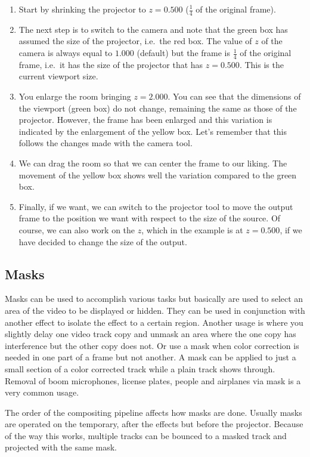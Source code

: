 \begin{enumerate}
    \item Start by shrinking the projector to $z=0.500$ ($\frac{1}{4}$ of the original frame).
    \item The next step is to switch to the camera and note that the green box has assumed the size of the projector, i.e.\ the red box. The value of $z$ of the camera is always equal to $1.000$ (default) but the frame is $\frac{1}{4}$ of the original frame, i.e.\ it has the size of the projector that has $z=0.500$. This is the current viewport size.
    \item You enlarge the room bringing $z=2.000$. You can see that the dimensions of the viewport (green box) do not change, remaining the same as those of the projector. However, the frame has been enlarged and this variation is indicated by the enlargement of the yellow box. Let's remember that this follows the changes made with the camera tool.
    \item We can drag the room so that we can center the frame to our liking. The movement of the yellow box shows well the variation compared to the green box.
    \item Finally, if we want, we can switch to the projector tool to move the output frame to the position we want with respect to the size of the source. Of course, we can also work on the $z$, which in the example is at $z=0.500$, if we have decided to change the size of the output.
\end{enumerate}

\subsection{Masks}%
\label{sub:masks}

Masks can be used to accomplish various tasks but basically are used to select an area of the 
video to be displayed or hidden. 
They can be used in conjunction with another effect to isolate the effect to a certain region.
Another usage is where you slightly delay one video track copy and unmask an area where
the one copy has interference but the other copy does not.  Or use a mask when  color correction is
needed in one part of a frame but not another.  A mask can be applied to just a small section of
a color corrected track while a plain track shows through. 
Removal of boom microphones, license plates, people and airplanes via mask is a very common usage.

The order of the compositing pipeline affects how masks are done. Usually masks are operated on the
temporary, after the effects but before the projector. Because of the way this works, multiple
tracks can be bounced to a masked track and projected with the same mask.

